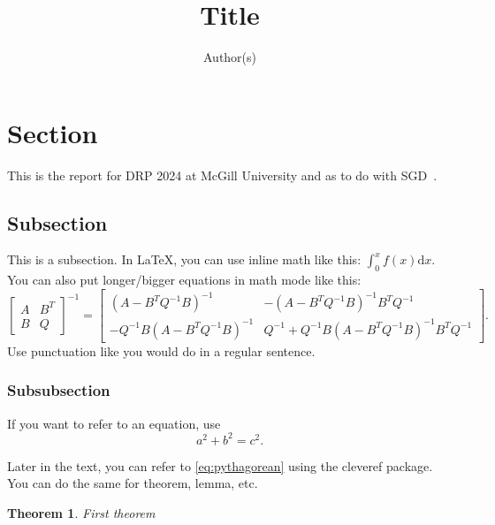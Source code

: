 \documentclass[12pt, letterpaper]{article}
\theoremstyle{plain}
\newtheorem{theorem}{Theorem}[section]
\theoremstyle{remark}
\def\d{\mathrm{d}}
\begin{document}
\title{Title}
\author{Author(s)}

\maketitle



\section{Section}

This is the report for DRP 2024 at McGill University and as to do with SGD~\cite{wiki:sgd}.

\subsection{Subsection}

This is a subsection. In \LaTeX, you can use inline math like this: \(\int_{0}^{x}f(x)\d x\). You can also put longer/bigger equations in math mode like this:
\[
    \begin{bmatrix}
        A & B^{T} \\
        B & Q 
    \end{bmatrix}^{-1}
    = \begin{bmatrix}
        (A-B^{T}Q^{-1}B)^{-1} & -(A-B^{T}Q^{-1}B)^{-1}B^{T}Q^{-1} \\
        -Q^{-1}B(A-B^{T}Q^{-1}B)^{-1} & Q^{-1} + Q^{-1}B(A-B^{T}Q^{-1}B)^{-1}B^{T}Q^{-1}
    \end{bmatrix}.
\]
Use punctuation like you would do in a regular sentence. 

\subsubsection{Subsubsection}
If you want to refer to an equation, use
\begin{equation}\label{eq:pythagorean}
    a^{2} + b^{2} = c^{2}.
\end{equation}

Later in the text, you can refer to \cref{eq:pythagorean} using the cleveref package. You can do the same for theorem, lemma, etc.

\begin{theorem}\label{theorem:first_theorem}
    First theorem
\end{theorem}
\end{document}
